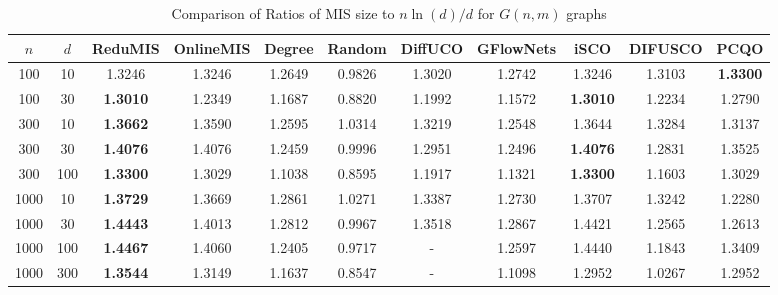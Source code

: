 \begin{table*}[htbp]
\centering
\small
\caption{Comparison of Ratios of MIS size to $n\ln(d)/d$ for $G(n,m)$ graphs   }
\label{tab:ratios}

\begin{adjustbox}{width=\textwidth}
\begin{tabular}{ccccccccccc}
\toprule
$n$ & $d$ & ReduMIS & OnlineMIS & Degree & Random & DiffUCO & GFlowNets & iSCO & DIFUSCO & PCQO\\
\midrule
100  & 10   & 1.3246 & 1.3246 & 1.2649 & 0.9826 & 1.3020 &1.2742&  1.3246 &1.3103 &\bf 1.3300\\
100  & 30   & \bf 1.3010 & 1.2349    & 1.1687 & 0.8820 & 1.1992 & 1.1572&\bf1.3010 & 1.2234 & 1.2790\\
300  & 10   & \bf1.3662 & 1.3590 & 1.2595 & 1.0314 & 1.3219 & 1.2548&1.3644 &1.3284 & 1.3137\\
300  & 30   &\bf 1.4076 & 1.4076 & 1.2459 & 0.9996 & 1.2951 & 1.2496&\bf1.4076 &1.2831 & 1.3525\\
300  & 100  &\bf 1.3300 & 1.3029  & 1.1038 & 0.8595 & 1.1917 & 1.1321&\bf1.3300 &1.1603 & 1.3029\\
1000 & 10   & \bf1.3729 & 1.3669 & 1.2861 & 1.0271 & 1.3387 & 1.2730&1.3707 &1.3242 & 1.2280\\
1000 & 30   & \bf1.4443 & 1.4013 & 1.2812 & 0.9967 & 1.3518 & 1.2867& 1.4421 &1.2565 & 1.2613\\
1000 & 100  & \bf1.4467 & 1.4060 & 1.2405 & 0.9717 & -      & 1.2597&1.4440 &1.1843 & 1.3409\\
1000 & 300  & \bf1.3544 & 1.3149 & 1.1637 & 0.8547 & -      & 1.1098&1.2952 &1.0267 & 1.2952\\
\bottomrule
\end{tabular}
\end{adjustbox}
\end{table*}
